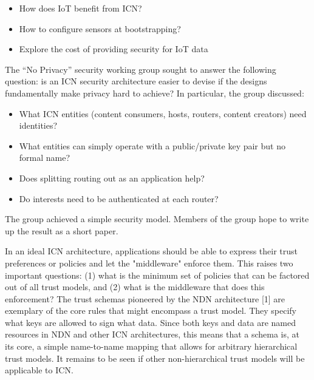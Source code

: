 \documentclass[a4paper,UKenglish]{dagrep}
\begin{document}
\begin{itemize}
\item How does IoT benefit from ICN?
\item How to configure sensors at bootstrapping?
\item Explore the cost of providing security for IoT data
\end{itemize}

\license

The ``No Privacy'' security working group sought to answer the following question: is an ICN security architecture easier to devise if the designs fundamentally make privacy hard to achieve? In particular, the group discussed:

\begin{itemize}
\item What ICN entities (content consumers, hosts, routers, content creators) need identities?
\item What entities can simply operate with a public/private key pair but no formal name?
\item Does splitting routing out as an application help?
\item Do interests need to be authenticated at each router?
\end{itemize}

The group achieved a simple security model. Members of the group hope to write up the result as a short paper.

\license

In an ideal ICN architecture, applications should be able to express their trust preferences or policies and let the "middleware" enforce them. This raises two important questions: (1) what is the minimum set of policies that can be factored out of all trust models, and (2) what is the middleware that does this enforcement? The trust schemas pioneered by the NDN architecture [1] are exemplary of the core rules that might encompass a trust model. They specify what keys are allowed to sign what data. Since both keys and data are named resources in NDN and other ICN architectures, this means that a schema is, at its core, a simple name-to-name mapping that allows for arbitrary hierarchical trust models. It remains to be seen if other non-hierarchical trust models will be applicable to ICN.
\end{document}
